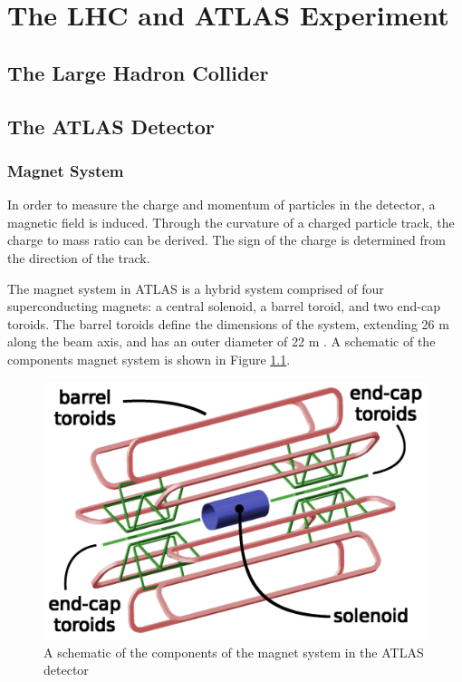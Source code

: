 \chapter{The LHC and ATLAS Experiment}
\section{The Large Hadron Collider}
\section{The ATLAS Detector}
\subsection{Magnet System}
In order to measure the charge and momentum of particles in the detector, a magnetic field is induced. Through the curvature of a charged particle track, the charge to mass ratio can be derived. The sign of the charge is determined from the direction of the track.

The magnet system in ATLAS is a hybrid system comprised of four superconducting magnets: a central solenoid, a barrel toroid, and two end-cap toroids. The barrel toroids define the dimensions of the system, extending 26 m along the beam axis, and has an outer diameter of 22 m
\cite{magnet-system-tdr}. A schematic of the components magnet system is shown in Figure \ref{fig:magnetSystem}.

\begin{figure}
    \centering
    \includegraphics[width=.9\textwidth]{chapters/chapter2_experiment/images/magnetSystems.png}
    \caption{A schematic of the components of the magnet system in the ATLAS detector \cite{magnet-schematic}}
    \label{fig:magnetSystem}
\end{figure}

